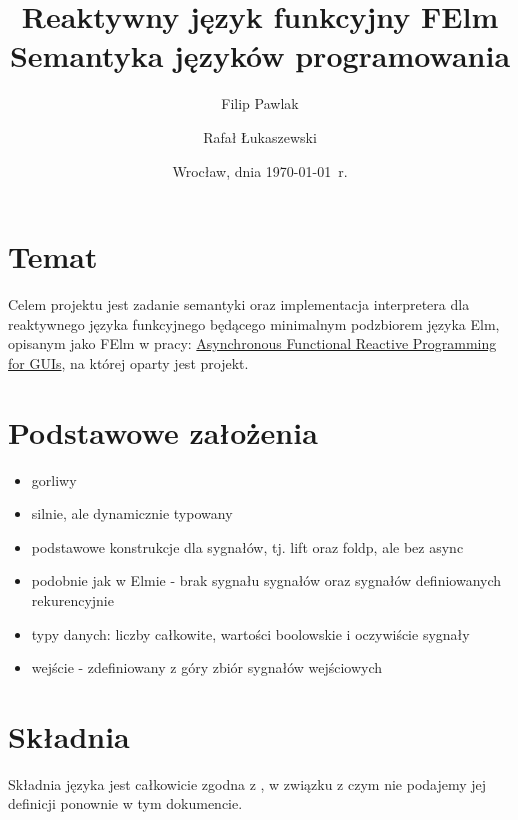 \documentclass[11pt,leqno]{article}
\title{{\textbf{Reaktywny język funkcyjny \textbf{FElm}}}\\[1ex]
       {\Large Semantyka języków programowania}\\[-1ex]}
\author{Filip Pawlak \and Rafał Łukaszewski}
\date{Wrocław, dnia \today\ r.}
\begin{document}
\thispagestyle{empty}
\maketitle


\section{Temat}

Celem projektu jest zadanie semantyki oraz implementacja interpretera dla reaktywnego języka funkcyjnego będącego minimalnym podzbiorem języka Elm, opisanym jako FElm w pracy: \href{http://people.seas.harvard.edu/~chong/abstracts/CzaplickiC13.html} {Asynchronous Functional Reactive Programming for GUIs}, na której oparty jest projekt.

\section{Podstawowe założenia}

\begin{itemize}
  \item gorliwy
  \item silnie, ale dynamicznie typowany
  \item podstawowe konstrukcje dla sygnałów, tj. lift oraz foldp, ale bez async
  \item podobnie jak w Elmie - brak sygnału sygnałów oraz sygnałów definiowanych rekurencyjnie
  \item typy danych: liczby całkowite, wartości boolowskie i oczywiście sygnały
  \item wejście - zdefiniowany z góry zbiór sygnałów wejściowych
\end{itemize}

\section{Składnia}

Składnia języka jest całkowicie zgodna z \cite[p.~3.1]{CC}, w związku z czym nie podajemy jej definicji ponownie w tym dokumencie.
\end{document}
